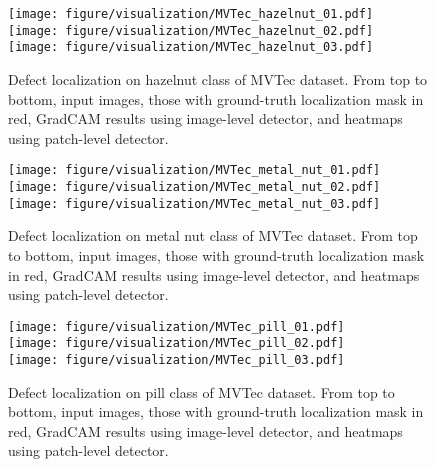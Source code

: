 \documentclass[final]{cvpr}
\begin{document}
\begin{figure}
    \centering
    \texttt{[image: figure/visualization/MVTec\_hazelnut\_01.pdf]}\\
    \vspace{0.05in}
    \texttt{[image: figure/visualization/MVTec\_hazelnut\_02.pdf]}\\
    \vspace{0.05in}
    \texttt{[image: figure/visualization/MVTec\_hazelnut\_03.pdf]}
    \caption{Defect localization on hazelnut class of MVTec dataset. From top to bottom, input images, those with ground-truth localization mask in red, GradCAM results using image-level detector, and heatmaps using patch-level detector.}
    \label{fig:heatmap_hazelnut}
\end{figure}

\begin{figure}
    \centering
    \texttt{[image: figure/visualization/MVTec\_metal\_nut\_01.pdf]}\\
    \vspace{0.05in}
    \texttt{[image: figure/visualization/MVTec\_metal\_nut\_02.pdf]}\\
    \vspace{0.05in}
    \texttt{[image: figure/visualization/MVTec\_metal\_nut\_03.pdf]}
    \caption{Defect localization on metal nut class of MVTec dataset. From top to bottom, input images, those with ground-truth localization mask in red, GradCAM results using image-level detector, and heatmaps using patch-level detector.}
    \label{fig:heatmap_metalnut}
\end{figure}

\begin{figure}
    \centering
    \texttt{[image: figure/visualization/MVTec\_pill\_01.pdf]}\\
    \vspace{0.05in}
    \texttt{[image: figure/visualization/MVTec\_pill\_02.pdf]}\\
    \vspace{0.05in}
    \texttt{[image: figure/visualization/MVTec\_pill\_03.pdf]}
    \caption{Defect localization on pill class of MVTec dataset. From top to bottom, input images, those with ground-truth localization mask in red, GradCAM results using image-level detector, and heatmaps using patch-level detector.}
    \label{fig:heatmap_pill}
\end{figure}
\end{document}
